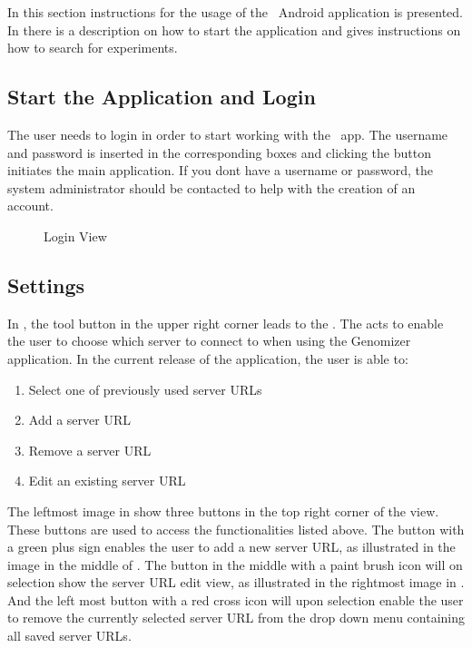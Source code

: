In this section instructions for the usage of the \appName\ Android application is presented. In  there is a description on how to start the application and  gives instructions on how to search for experiments.

\subsection{Start the Application and Login}
\label{sec:and_start}


The user needs to login in order to start working with the \appName\ app.
The username and password is inserted in the corresponding boxes and clicking the 
button initiates the main application. If you dont have a username or password, the system administrator
should be contacted to help with the creation of an account.

\begin{figure}[h]
\caption{Login View}
\label{fig:and_login_man}
\end{figure}
\FloatBarrier




\subsection{Settings}\label{sec:and_manual_settings}
In , the tool button in the upper right corner leads to the .
The  acts to enable the user to choose which server to connect to when using the Genomizer application. In the current release of the application, the user is able to:

\begin{enumerate}
\item Select one of previously used server URLs
\item Add a server URL
\item Remove a server URL
\item Edit an existing server URL
\end{enumerate}

The leftmost image in  show three buttons in the top right corner of the view. 
These buttons are used to access the functionalities listed above. The button with a green plus sign enables 
the user to add a new server URL, as illustrated in the image in the middle of .
The button in the middle with a paint brush icon will on selection show the server URL edit view,
as illustrated in the rightmost image in . And the left most button with a red cross
icon will upon selection enable the user to remove the currently selected server URL 
from the drop down menu containing all saved server URLs.


